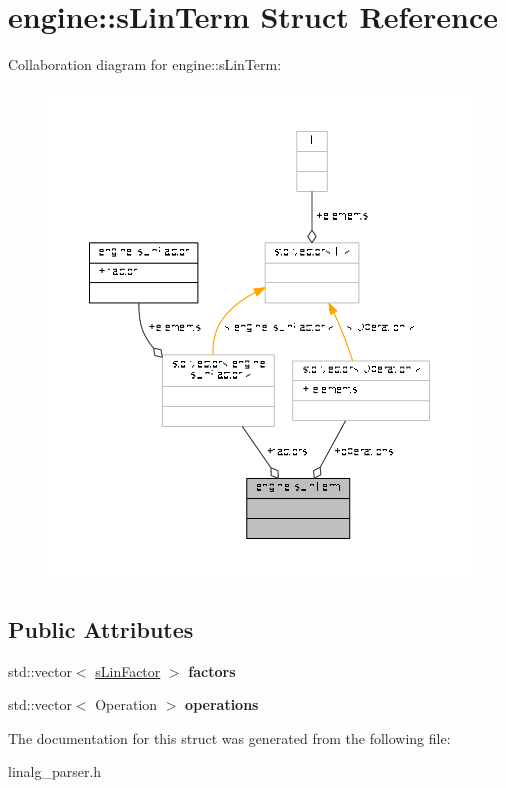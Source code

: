 \hypertarget{structengine_1_1sLinTerm}{\section{engine\-:\-:s\-Lin\-Term Struct Reference}
\label{structengine_1_1sLinTerm}
}


Collaboration diagram for engine\-:\-:s\-Lin\-Term\-:
\nopagebreak
\begin{figure}[H]
\begin{center}
\leavevmode
\includegraphics[width=350pt]{structengine_1_1sLinTerm__coll__graph}
\end{center}
\end{figure}
\subsection*{Public Attributes}
\begin{DoxyCompactItemize}
\item 
\hypertarget{structengine_1_1sLinTerm_aee91b1a7819241c20825afa6a3ee4084}{std\-::vector$<$ \hyperlink{structengine_1_1sLinFactor}{s\-Lin\-Factor} $>$ {\bfseries factors}}\label{structengine_1_1sLinTerm_aee91b1a7819241c20825afa6a3ee4084}

\item 
\hypertarget{structengine_1_1sLinTerm_a3c3cb87999a21f0db665b42fdcd98ca2}{std\-::vector$<$ Operation $>$ {\bfseries operations}}\label{structengine_1_1sLinTerm_a3c3cb87999a21f0db665b42fdcd98ca2}

\end{DoxyCompactItemize}


The documentation for this struct was generated from the following file\-:\begin{DoxyCompactItemize}
\item 
linalg\-\_\-parser.\-h\end{DoxyCompactItemize}
